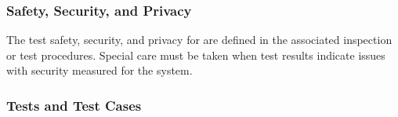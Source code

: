 \subsubsection{Safety, Security, and Privacy}
\label{loc:TestSafetySecurityPrivacy\TestIdName}

The test safety, security, and privacy for \TestIdNameX are defined in the associated inspection or test procedures.
Special care must be taken when test results indicate issues with security measured for the system.

\subsubsection{Tests and Test Cases}
\label{loc:TestsAndTestCases\TestIdName}

